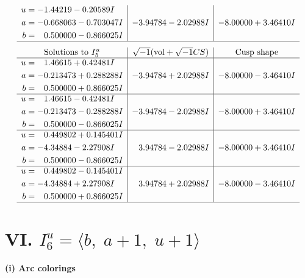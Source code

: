 \documentclass[1p]{elsarticle_modified}
\theoremstyle{definition}
\newcommand{\I}{\sqrt{-1}}
\begin{document}
$$\begin{array}{c|c|c}
\begin{aligned}
u &= -1.44219 - 0.20589 I \\
a &= -0.668063 - 0.703047 I \\
b &= \phantom{-}0.500000 - 0.866025 I\end{aligned}
 & -3.94784 - 2.02988 I & -8.00000 + 3.46410 I\\
 \hline 
 \end{array}$$\newpage$$\begin{array}{c|c|c}  
\text{Solutions to }I^u_{5}& \I (\text{vol} + \sqrt{-1}CS) & \text{Cusp shape}\\
 \hline 
\begin{aligned}
u &= \phantom{-}1.46615 + 0.42481 I \\
a &= -0.213473 + 0.288288 I \\
b &= \phantom{-}0.500000 + 0.866025 I\end{aligned}
 & -3.94784 + 2.02988 I & -8.00000 - 3.46410 I \\ \hline\begin{aligned}
u &= \phantom{-}1.46615 - 0.42481 I \\
a &= -0.213473 - 0.288288 I \\
b &= \phantom{-}0.500000 - 0.866025 I\end{aligned}
 & -3.94784 - 2.02988 I & -8.00000 + 3.46410 I \\ \hline\begin{aligned}
u &= \phantom{-}0.449802 + 0.145401 I \\
a &= -4.34884 - 2.27908 I \\
b &= \phantom{-}0.500000 - 0.866025 I\end{aligned}
 & \phantom{-}3.94784 - 2.02988 I & -8.00000 + 3.46410 I \\ \hline\begin{aligned}
u &= \phantom{-}0.449802 - 0.145401 I \\
a &= -4.34884 + 2.27908 I \\
b &= \phantom{-}0.500000 + 0.866025 I\end{aligned}
 & \phantom{-}3.94784 + 2.02988 I & -8.00000 - 3.46410 I\\
 \hline 
 \end{array}$$\newpage\newpage\renewcommand{\arraystretch}{1}
\centering \section*{VI. $I^u_{6}= \langle b,\;a+1,\;u+1 \rangle$}
\flushleft \textbf{(i) Arc colorings}\\
\end{document}
